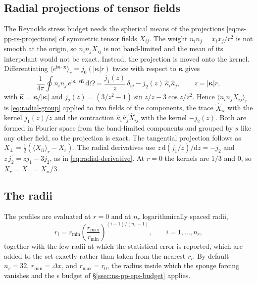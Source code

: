 \documentclass{article}
\begin{document}
\subsection{Radial projections of tensor fields}\label{ssec:radial-tensor}
The Reynolds stress budget needs the spherical means of the projections
\eqref{eq:ns-pp-rs-projections} of symmetric tensor fields $X_{ij}$. The
weight $n_i n_j = x_i x_j / r^2$ is not smooth at the origin, so
$n_i n_j X_{ij}$ is not band-limited and the mean of its interpolant would
not be exact. Instead, the projection is moved onto the kernel. Differentiating
$\langle e^{\mathrm{i} \boldsymbol{\kappa} \cdot \mathbf{x}} \rangle_r = j_0(|\boldsymbol{\kappa}| r)$
twice with respect to $\boldsymbol{\kappa}$ gives
\begin{equation}\label{eq:radial-tensor}
  \frac{1}{4\pi} \oint n_i n_j\, e^{\mathrm{i} \boldsymbol{\kappa} \cdot r \hat{\mathbf{n}}}\,
  \mathrm{d}\Omega
  = \frac{j_1(z)}{z}\, \delta_{ij} - j_2(z)\, \hat\kappa_i \hat\kappa_j ,
  \qquad z = |\boldsymbol{\kappa}| r ,
\end{equation}
with $\hat{\boldsymbol{\kappa}} = \boldsymbol{\kappa}/|\boldsymbol{\kappa}|$ and
$j_2(z) = (3/z^2 - 1) \sin z / z - 3 \cos z / z^2$. Hence
$\langle n_i n_j X_{ij} \rangle_r$ is \eqref{eq:radial-group} applied to two
fields of the components, the trace $\hat X_{ii}$ with the kernel $j_1(z)/z$
and the contraction $\hat\kappa_i \hat\kappa_j \hat X_{ij}$ with the kernel
$-j_2(z)$. Both are formed in Fourier space from the band-limited components
and grouped by $s$ like any other field, so the projection is exact. The
tangential projection follows as
$X_\perp = \tfrac12 (\langle X_{ii} \rangle_r - X_r)$. The radial derivatives
use $z\, \mathrm{d}(j_1/z)/\mathrm{d}z = -j_2$ and
$z\, j_2^\prime = z j_1 - 3 j_2$, as in \eqref{eq:radial-derivative}. At
$r = 0$ the kernels are $1/3$ and $0$, so $X_r = X_\perp = X_{ii}/3$.

\subsection{The radii}\label{ssec:radial-radii}
The profiles are evaluated at $r = 0$ and at $n_r$ logarithmically spaced
radii,
\begin{equation}\label{eq:radial-radii}
  r_i = r_{\min} \left( \frac{r_{\max}}{r_{\min}} \right)^{(i-1)/(n_r - 1)},
  \qquad i = 1, \dots, n_r,
\end{equation}
together with the few radii at which the statistical error is reported,
which are added to the set exactly rather than taken from the nearest $r_i$.
By default $n_r = 32$, $r_{\min} = \Delta x$, and $r_{\max} = r_0$, the radius
inside which the sponge forcing vanishes and the $\epsilon$ budget of
\S\ref{ssec:ns-pp-eps-budget} applies.
\end{document}
